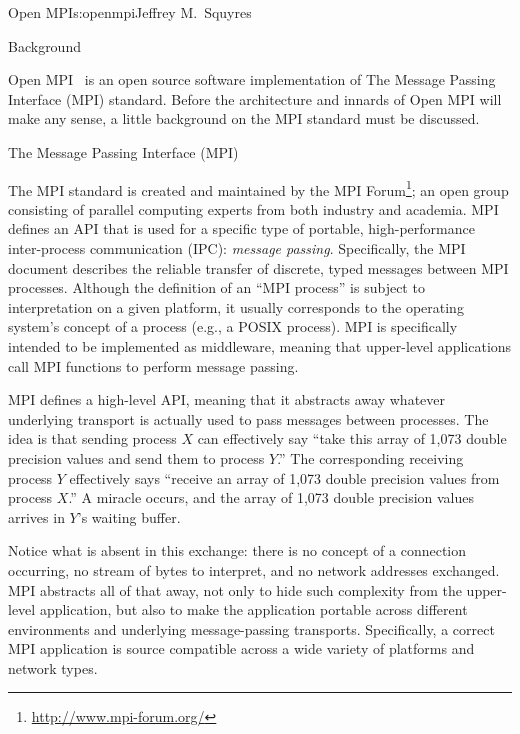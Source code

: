 \begin{aosachapter}{Open MPI}{s:openmpi}{Jeffrey M.\ Squyres}

\begin{aosasect1}{Background}

Open MPI~\cite{bib:open-mpi-general} is an open source software
implementation of The Message Passing Interface (MPI) standard.
Before the architecture and innards of Open MPI will make any sense,
a little background on the MPI standard must be discussed.


\begin{aosasect2}{The Message Passing Interface (MPI)}

The MPI standard is created and maintained by the MPI
Forum\footnote{\url{http://www.mpi-forum.org/}}; an open group
consisting of parallel computing experts from both industry and
academia.  MPI defines an API that is used for a specific type of
portable, high-performance inter-process communication (IPC):
\emph{message passing}.  Specifically, the MPI document describes the
reliable transfer of discrete, typed messages between MPI processes.
Although the definition of an ``MPI process'' is subject to
interpretation on a given platform, it usually corresponds to the
operating system's concept of a process (e.g., a POSIX process).  MPI
is specifically intended to be implemented as middleware, meaning that
upper-level applications call MPI functions to perform message
passing.

MPI defines a high-level API, meaning that it abstracts away whatever
underlying transport is actually used to pass messages between
processes.  The idea is that sending process $X$ can effectively say
``take this array of 1,073 double precision values and send them to
process $Y$.''  The corresponding receiving process $Y$ effectively
says ``receive an array of 1,073 double precision values from process
$X$.''  A miracle occurs, and the array of 1,073 double precision
values arrives in $Y$'s waiting buffer.

Notice what is absent in this exchange: there is no concept of a
connection occurring, no stream of bytes to interpret, and no network
addresses exchanged.  MPI abstracts all of that away, not only to hide
such complexity from the upper-level application, but also to make the
application portable across different environments and underlying
message-passing transports.  Specifically, a correct MPI application
is source compatible across a wide variety of platforms and network
types.


\end{aosasect2}
\end{aosasect1}
\end{aosachapter}
